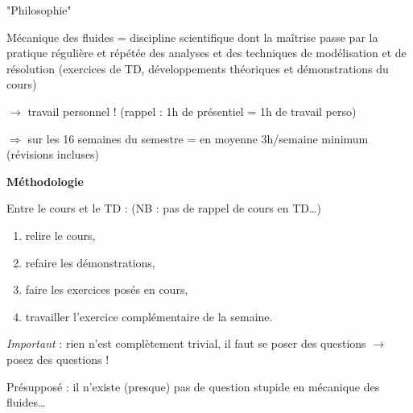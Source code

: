\begin{frame}{"Philosophie"}

\small

Mécanique des fluides = discipline scientifique dont la maîtrise passe par la pratique régulière et
 répétée des analyses et des techniques de modélisation et de résolution 
 (exercices de TD, développements théoriques et démonstrations du cours)

\bigskip

\qquad $\rightarrow$ \textcolor{rouge}{travail personnel !} \quad (rappel : 1h de présentiel = 1h de travail perso)

\medskip
\qquad $\Rightarrow$ sur les 16 semaines du semestre = en moyenne 3h/semaine minimum (révisions incluses)

\vspace{5mm}
\pause

\textbf{Méthodologie}

\medskip
Entre le cours et le TD : \hfill (NB : pas de rappel de cours en TD\ldots)
\begin{enumerate}
\item relire le cours, 
\item refaire les démonstrations,
\item faire les exercices posés en cours,
\item travailler l'exercice complémentaire de la semaine.
\end{enumerate}

\vspace{5mm}
\pause

\textsl{Important} : rien n'est complètement trivial, il faut \textcolor{rouge}{se} poser des questions 
$\rightarrow$ \textcolor{rouge}{posez des questions !}

\medskip
Présupposé : il n'existe (presque) pas de question stupide en mécanique des fluides\ldots

\vspace{10mm}

\end{frame}

